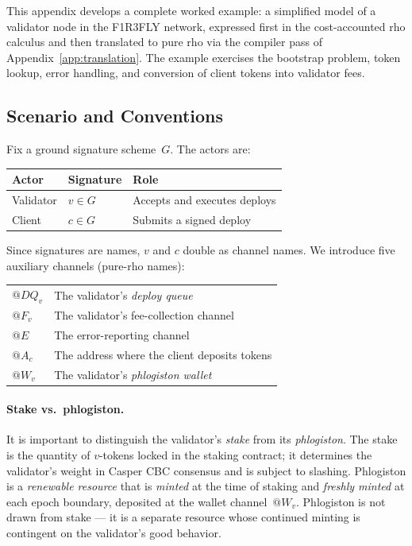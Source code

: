 \documentclass[11pt,a4paper]{article}
\makeatletter
\newcommand{\quot}[1]{@#1}
\makeatother
\begin{document}
This appendix develops a complete worked example: a simplified
model of a validator node in the F1R3FLY network, expressed
first in the cost-accounted rho calculus and then translated
to pure rho via the compiler pass of Appendix~\ref{app:translation}.
The example exercises the bootstrap problem, token lookup,
error handling, and conversion of client tokens into validator
fees.

\subsection{Scenario and Conventions}
\label{app:ex-scenario}

Fix a ground signature scheme~$G$.  The actors are:

\begin{center}
  \begin{tabular}{lll}
    \textbf{Actor} & \textbf{Signature} & \textbf{Role} \\
    \midrule
    Validator & $v \in G$ & Accepts and executes deploys \\
    Client    & $c \in G$ & Submits a signed deploy \\
  \end{tabular}
\end{center}

\noindent
Since signatures are names, $v$ and $c$ double as channel
names.  We introduce five auxiliary channels (pure-rho names):

\begin{center}
  \begin{tabular}{ll}
    $\quot{DQ_v}$ & The validator's \emph{deploy queue} \\
    $\quot{F_v}$ & The validator's fee-collection channel \\
    $\quot{E}$   & The error-reporting channel \\
    $\quot{A_c}$ & The address where the client deposits tokens \\
    $\quot{W_v}$ & The validator's \emph{phlogiston wallet} \\
  \end{tabular}
\end{center}

\paragraph{Stake vs.\ phlogiston.}
It is important to distinguish the validator's \emph{stake}
from its \emph{phlogiston}.  The stake is the quantity of
$v$-tokens locked in the staking contract; it determines the
validator's weight in Casper CBC consensus and is subject to
slashing.  Phlogiston is a \emph{renewable resource} that is
\emph{minted} at the time of staking and \emph{freshly
minted} at each epoch boundary, deposited at the wallet
channel~$\quot{W_v}$.  Phlogiston is not drawn from stake
--- it is a separate resource whose continued minting is
contingent on the validator's good behavior.
\end{document}
